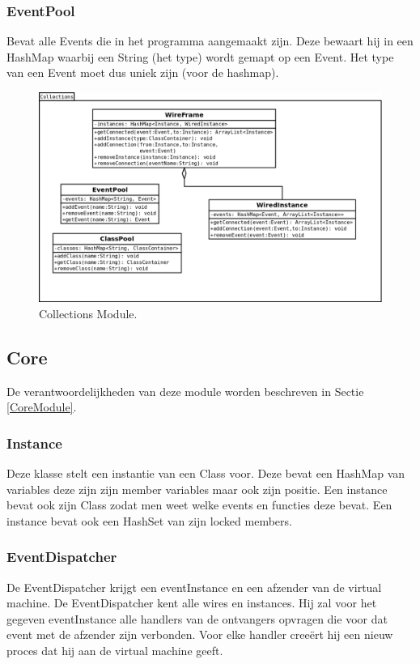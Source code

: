 \documentclass[]{article}
\begin{document}
\subsubsection{EventPool}
\label{EventPoolClass}
Bevat alle Events die in het programma aangemaakt zijn. Deze bewaart hij in een HashMap \cite{hashmap} waarbij een String (het type) wordt gemapt op een Event. Het type van een Event moet dus uniek zijn (voor de hashmap).


\clearpage
 \begin{figure}
  \centering
   
\includegraphics[scale=0.8]{./AnalyseClassenDiagram/collections.png}
  \caption{Collections Module.} \label{collectionsUML}
\end{figure}
\clearpage

\subsection{Core}
De verantwoordelijkheden van deze module worden beschreven in Sectie \ref{CoreModule}.
\subsubsection{Instance}
Deze klasse stelt een instantie van een Class voor. Deze bevat een HashMap \cite{hashmap} van variables deze zijn zijn member variables maar ook zijn positie. Een instance bevat ook zijn Class zodat men weet welke events en functies deze bevat. Een instance bevat ook een HashSet van zijn locked members. 
\subsubsection{EventDispatcher}
\label{eventdispatcher}
De EventDispatcher krijgt een eventInstance en een afzender van de virtual machine. De EventDispatcher kent alle wires en instances. Hij zal voor het gegeven eventInstance alle handlers van de ontvangers opvragen die voor dat event met de afzender zijn verbonden. Voor elke handler cree\"{e}rt hij een nieuw proces dat hij aan de virtual machine geeft.
\end{document}
